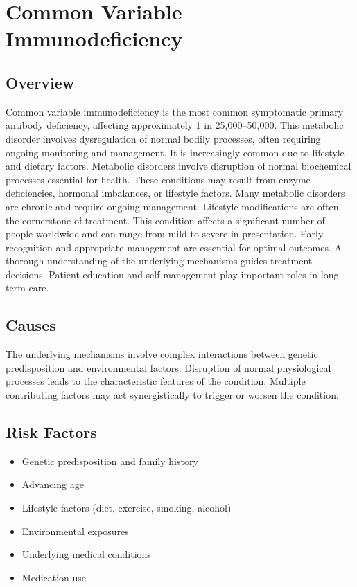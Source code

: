\chapter{Common Variable Immunodeficiency}
\label{sec:Common Variable Immunodeficiency}

\section{Overview}
Common variable immunodeficiency is the most common symptomatic primary antibody deficiency, affecting approximately 1 in 25,000--50,000. This metabolic disorder involves dysregulation of normal bodily processes, often requiring ongoing monitoring and management. It is increasingly common due to lifestyle and dietary factors. Metabolic disorders involve disruption of normal biochemical processes essential for health. These conditions may result from enzyme deficiencies, hormonal imbalances, or lifestyle factors. Many metabolic disorders are chronic and require ongoing management. Lifestyle modifications are often the cornerstone of treatment. This condition affects a significant number of people worldwide and can range from mild to severe in presentation. Early recognition and appropriate management are essential for optimal outcomes. A thorough understanding of the underlying mechanisms guides treatment decisions. Patient education and self-management play important roles in long-term care.
\section{Causes}
The underlying mechanisms involve complex interactions between genetic predisposition and environmental factors. Disruption of normal physiological processes leads to the characteristic features of the condition. Multiple contributing factors may act synergistically to trigger or worsen the condition.
\section{Risk Factors}
\begin{itemize}[noitemsep]
  \item Genetic predisposition and family history
  \item Advancing age
  \item Lifestyle factors (diet, exercise, smoking, alcohol)
  \item Environmental exposures
  \item Underlying medical conditions
  \item Medication use
\end{itemize}
